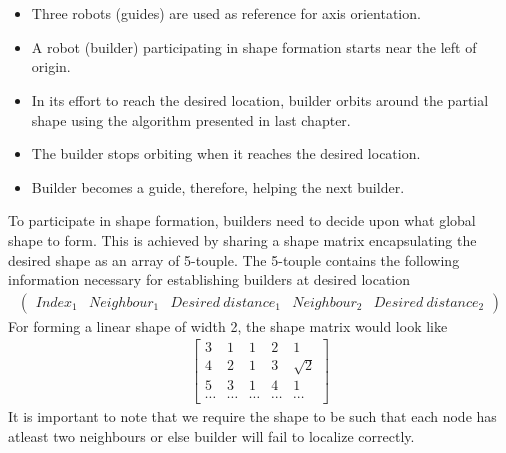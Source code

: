 \documentclass{report}[12pt]
\begin{document}
\section{}
\begin{itemize}
        \item Three robots (guides) are used as reference for axis orientation.
        \item A robot (builder) participating in shape formation starts near the left of origin.
        \item In its effort to reach the desired location, builder orbits around the partial shape using the algorithm presented in last chapter.
        \item The builder stops orbiting when it reaches the desired location.
        \item Builder becomes a guide, therefore, helping the next builder.
\end{itemize}
To participate in shape formation, builders need to decide upon what global shape to form. This is achieved by sharing a shape matrix encapsulating the desired shape as an array of 5-touple. The 5-touple contains the following information necessary for establishing builders at desired location
\begin{align}
\left(
\begin{matrix}
    Index_1 & Neighbour_1 & Desired\ distance_1 & Neighbour_2 & Desired\ distance_2
\end{matrix}
\right)
\end{align}
For forming a linear shape of width 2, the shape matrix would look like
\begin{align}
\label{eq:shape_matrix_linear}
\begin{bmatrix}
    3 & 1 & 1 & 2 & 1\\
    4 & 2 & 1 & 3 & \sqrt{2}\\
    5 & 3 & 1 & 4 & 1\\
    \cdots & \cdots & \cdots & \cdots & \cdots
\end{bmatrix}
\end{align}
It is important to note that we require the shape to be such that each node has atleast two neighbours or else builder will fail to localize correctly.
\end{document}
